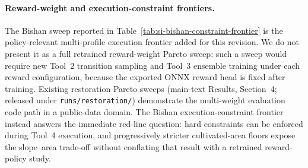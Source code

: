 \documentclass[11pt]{article}
\begin{document}
\paragraph{Reward-weight and execution-constraint frontiers.} The Bishan sweep reported in Table~\ref{tab:si-bishan-constraint-frontier} is the policy-relevant multi-profile execution frontier added for this revision. We do not present it as a full retrained reward-weight Pareto sweep: such a sweep would require new Tool~2 transition sampling and Tool~3 ensemble training under each reward configuration, because the exported ONNX reward head is fixed after training. Existing restoration Pareto sweeps (main-text Results, Section~4; released under \texttt{runs/restoration/}) demonstrate the multi-weight evaluation code path in a public-data domain. The Bishan execution-constraint frontier instead answers the immediate red-line question: hard constraints can be enforced during Tool~4 execution, and progressively stricter cultivated-area floors expose the slope--area trade-off without conflating that result with a retrained reward-policy study.
\end{document}
